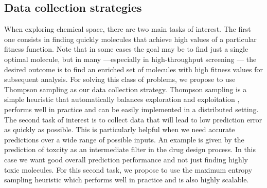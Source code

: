 \subsection{Data collection strategies}

When exploring chemical space, there are two main tasks of interest. The first one consists in finding quickly molecules that achieve high values of a particular fitness function. Note that in some cases the goal may be to find just a single optimal molecule, but in many ---especially in high-throughput screening \cite{Pyzer_Knapp_2015a}--- the desired outcome is to find 
an enriched set of molecules with high fitness values for subsequent analysis. 
For solving this class of problems, we propose to use Thompson sampling \cite{Thompson_1933} as our data collection strategy. Thompson sampling is a simple heuristic that automatically balances exploration and exploitation \cite{Chapelle2011}, performs well in practice and can be easily implemented in a distributed setting.
The second task of interest is to collect data that will lead to low prediction error as quickly as possible. This is particularly helpful when we need accurate predictions over a wide range of possible inputs. An example is given by the prediction of toxcity as an intermediate filter in the drug design process. In this case we want good overall prediction performance and not just finding highly toxic molecules. For this second task, we propose to use the maximum entropy sampling heuristic \cite{MacKay_1992} which performs well in practice and is also highly scalable.